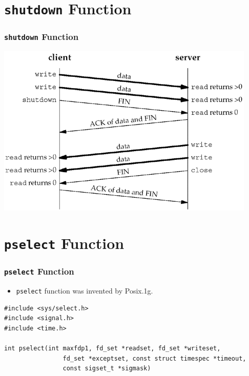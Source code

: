 \documentclass[notes,serif]{beamer}
\begin{document}
\section{\texttt{shutdown} Function}
\begin{frame}
\frametitle{\texttt{shutdown} Function}
 \begin{center}
  \includegraphics[width=.7\textwidth]{figs/06fig12.png}
  \end{center}
\end{frame}

\section{\texttt{pselect} Function}
\begin{frame}[containsverbatim]
\frametitle{\texttt{pselect} Function}
\begin{itemize}
  \item \texttt{pselect} function was invented by Posix.1g.
\end{itemize}
{\scriptsize
\begin{verbatim}
#include <sys/select.h>
#include <signal.h>
#include <time.h>

int pselect(int maxfdp1, fd_set *readset, fd_set *writeset,
                fd_set *exceptset, const struct timespec *timeout,
                const sigset_t *sigmask)

\end{verbatim}
}
\end{frame}
\end{document}
